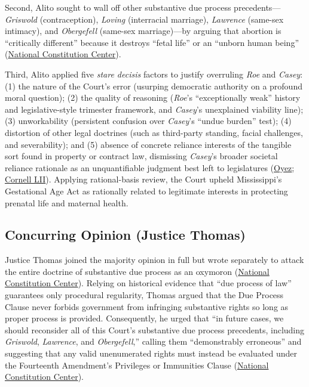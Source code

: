 \documentclass[12pt]{article}
\begin{document}
Second, Alito sought to wall off other substantive due process precedents---\textit{Griswold} (contraception), \textit{Loving} (interracial marriage), \textit{Lawrence} (same-sex intimacy), and \textit{Obergefell} (same-sex marriage)---by arguing that abortion is ``critically different'' because it destroys ``fetal life'' or an ``unborn human being'' (\href{https://constitutioncenter.org/the-constitution/supreme-court-case-library/dobbs-v-jackson-womens-health-organization}{National Constitution Center}).

Third, Alito applied five \textit{stare decisis} factors to justify overruling \textit{Roe} and \textit{Casey}: (1) the nature of the Court's error (usurping democratic authority on a profound moral question); (2) the quality of reasoning (\textit{Roe}'s ``exceptionally weak'' history and legislative-style trimester framework, and \textit{Casey}'s unexplained viability line); (3) unworkability (persistent confusion over \textit{Casey}'s ``undue burden'' test); (4) distortion of other legal doctrines (such as third-party standing, facial challenges, and severability); and (5) absence of concrete reliance interests of the tangible sort found in property or contract law, dismissing \textit{Casey}'s broader societal reliance rationale as an unquantifiable judgment best left to legislatures (\href{https://www.oyez.org/cases/2021/19-1392}{Oyez}; \href{https://www.law.cornell.edu/supremecourt/text/19-1392}{Cornell LII}). Applying rational-basis review, the Court upheld Mississippi's Gestational Age Act as rationally related to legitimate interests in protecting prenatal life and maternal health.

\subsection{Concurring Opinion (Justice Thomas)}

Justice Thomas joined the majority opinion in full but wrote separately to attack the entire doctrine of substantive due process as an oxymoron (\href{https://constitutioncenter.org/the-constitution/supreme-court-case-library/dobbs-v-jackson-womens-health-organization}{National Constitution Center}). Relying on historical evidence that ``due process of law'' guarantees only procedural regularity, Thomas argued that the Due Process Clause never forbids government from infringing substantive rights so long as proper process is provided. Consequently, he urged that ``in future cases, we should reconsider all of this Court's substantive due process precedents, including \textit{Griswold}, \textit{Lawrence}, and \textit{Obergefell},'' calling them ``demonstrably erroneous'' and suggesting that any valid unenumerated rights must instead be evaluated under the Fourteenth Amendment's Privileges or Immunities Clause (\href{https://constitutioncenter.org/the-constitution/supreme-court-case-library/dobbs-v-jackson-womens-health-organization}{National Constitution Center}).
\end{document}
